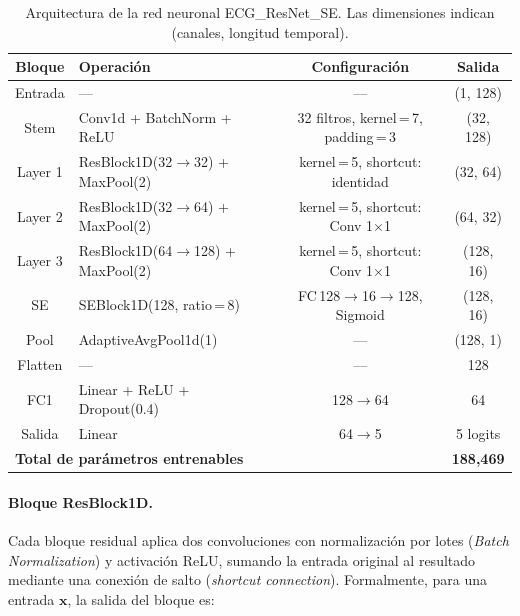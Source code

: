\begin{table}[h]
\caption{Arquitectura de la red neuronal ECG\_ResNet\_SE. Las dimensiones indican (canales, longitud temporal).}
\label{T_arquitectura}
\begin{center}
\begin{tabular}{clcc}
\hline
\textbf{Bloque} & \textbf{Operación} & \textbf{Configuración} & \textbf{Salida} \\ \hline
Entrada  & ---                                       & ---                                        & (1, 128)    \\
Stem     & Conv1d + BatchNorm + ReLU                 & 32 filtros, kernel\,=\,7, padding\,=\,3    & (32, 128)   \\
Layer 1  & ResBlock1D(32$\to$32) + MaxPool(2)        & kernel\,=\,5, shortcut: identidad          & (32, 64)    \\
Layer 2  & ResBlock1D(32$\to$64) + MaxPool(2)        & kernel\,=\,5, shortcut: Conv 1$\times$1    & (64, 32)    \\
Layer 3  & ResBlock1D(64$\to$128) + MaxPool(2)       & kernel\,=\,5, shortcut: Conv 1$\times$1    & (128, 16)   \\
SE       & SEBlock1D(128, ratio\,=\,8)               & FC\,128$\to$16$\to$128, Sigmoid            & (128, 16)   \\
Pool     & AdaptiveAvgPool1d(1)                      & ---                                        & (128, 1)    \\
Flatten  & ---                                       & ---                                        & 128         \\
FC1      & Linear + ReLU + Dropout(0.4)              & 128$\to$64                                 & 64          \\
Salida   & Linear                                    & 64$\to$5                                   & 5 logits    \\
\hline
\multicolumn{3}{l}{\textbf{Total de parámetros entrenables}} & \textbf{188,469} \\
\hline
\end{tabular}
\end{center}
\end{table}

\paragraph{Bloque ResBlock1D.}
Cada bloque residual aplica dos convoluciones con normalización por lotes (\textit{Batch Normalization}) y activación ReLU, sumando la entrada original al resultado mediante una conexión de salto (\textit{shortcut connection}). Formalmente, para una entrada $\mathbf{x}$, la salida del bloque es:

